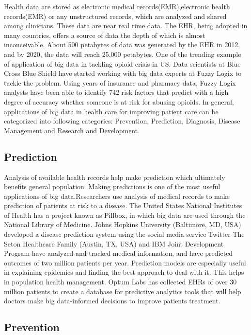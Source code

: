 \documentclass[sigconf]{acmart}
\begin{document}
Health data are stored as electronic medical records(EMR),electronic health records(EMR) or any unstructured records, 
which are analyzed and shared among clinicians. These data are near real time data. The EHR, being adopted in many countries, 
offers a source of data the depth of which is almost inconceivable. About 500 petabytes of data was generated by the EHR in 2012, 
and by 2020, the data will reach 25,000 petabytes\cite{www-ghdonline-org}. One of the trending example of application of big data in tackling opioid crisis in US.
Data scientists at Blue Cross Blue Shield have started working with big data experts at Fuzzy Logix to tackle the problem. 
Using years of insurance and pharmacy data, Fuzzy Logix analysts have been able to identify 742 risk factors that predict with a
high degree of accuracy whether someone is at risk for abusing opioids\cite{www-datapine-com}.
In general, applications of big data in health care for improving patient care can be categorized into following categories: Prevention, Prediction, Diagnosis, Disease Management and Research and Development.

\subsection{Prediction}

Analysis of available health records help make prediction which ultimately benefits general population. Making predictions is one 
of the most useful applications of big data.Researchers use analysis of medical records to make prediction of patients at risk
to a disease. The United States National Institutes of Health has a project known as Pillbox, in which big data are used through 
the National Library of Medicine\cite{www-tandf-com}. Johns Hopkins University (Baltimore, MD, USA) developed a disease 
prediction system using the social media service Twitter\cite{www-ncbi-nlm-nih-gov}
The Seton Healthcare Family (Austin, TX, USA) and IBM Joint Development Program have analyzed and tracked medical information, 
and have predicted outcomes of two million patients per
year\cite{www-uhcjsc-com}. Prediction models are especially useful in explaining epidemics and finding the best approach to
deal with it. This helps in population health management. Optum Labs has collected EHRs of over 30 million patients to create a
database for predictive analytics tools that will help doctors make big 
data-informed decisions to improve patients treatment\cite{www-mapr-com}.


\subsection{Prevention}
\end{document}
